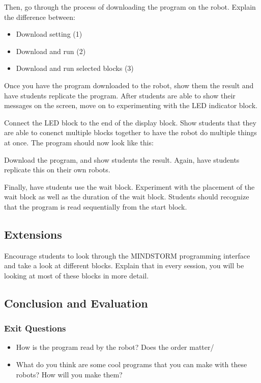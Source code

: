 \documentclass{lessonplan}
\begin{document}

	\par Then, go through the process of downloading the program on the robot. Explain the difference between:
	\begin{itemize}
		\item Download setting (1)
		\item Download and run (2)
		\item Download and run selected blocks (3)
	\end{itemize}

	\par Once you have the program downloaded to the robot, show them the result and have students replicate the program. After students are able to show their messages on the screen, move on to experimenting with the LED indicator block. 

	\par Connect the LED block to the end of the display block. Show students that they are able to conenct multiple blocks together to have the robot do multiple things at once. The program should now look like this: 
	

	\par Download the program, and show students the result. Again, have students replicate this on their own robots. 
	
	\par Finally, have students use the wait block. Experiment with the placement of the wait block as well as the duration of the wait block. Students should recognize that the program is read sequentially from the start block. 


    \subsection{Extensions}
	\par Encourage students to look through the MINDSTORM programming interface and take a look at different blocks. Explain that in every session, you will be looking at most of these blocks in more detail. 

    \subsection{Conclusion and Evaluation}
      \subsubsection{Exit Questions}
      \begin{itemize}
        	\item How is the program read by the robot? Does the order matter/
	\item What do you think are some cool programs that you can make with these robots? How will you make them?
      \end{itemize}
\end{document}
